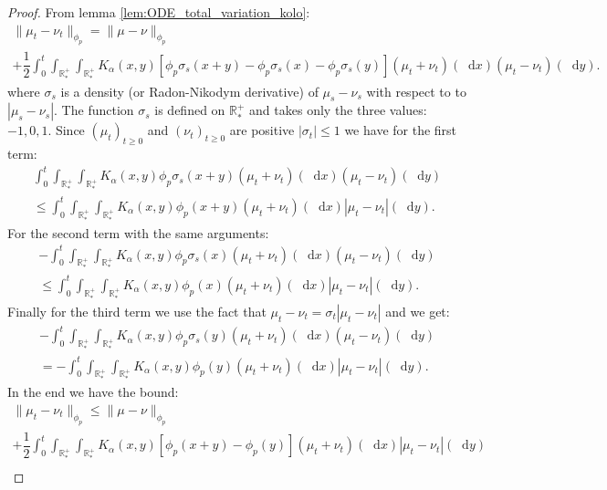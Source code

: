 \documentclass[11pt,a4paper]{article}
\newcommand{\RRP}{\mathbb{R}^+_*}
\newcommand{\Proc}[1]{\left(#1\right)_{t\geq 0}}
\newcommand{\dd}{\mathop{}\!\mathrm{d}}
\begin{document}
\begin{proof}
    From lemma \ref{lem:ODE_total_variation_kolo}:
    \begin{multline*}
        \| \mu_t - \nu_t\|_{\phi_p} = \|\mu- \nu\|_{\phi_p} \\
        + \dfrac12\int_0^t \int_{\RRP}\int_{\RRP} K_\alpha(x,y) \left[\phi_p\sigma_s(x+y) - \phi_p\sigma_s(x) - \phi_p\sigma_s(y) \right]\left(\mu_t + \nu_t\right)(\dd x) \left(\mu_t - \nu_t\right)(\dd y).
    \end{multline*}
    where $\sigma_s$ is a density (or Radon-Nikodym derivative) of $\mu_s - \nu_s$ with respect to to $|\mu_s - \nu_s|$. The function $\sigma_s$ is defined on $\RRP$ and takes only the three values: $-1,0,1$. Since $\Proc{\mu_t}$ and $\Proc{\nu_t}$ are positive $|\sigma_t| \leq 1$ we have for the first term:
    \begin{multline*}
        \int_0^t \int_{\RRP}\int_{\RRP} K_\alpha(x,y) \phi_p\sigma_s(x+y)\left(\mu_t + \nu_t\right)(\dd x) \left(\mu_t - \nu_t\right)(\dd y) \\
        \leq \int_0^t \int_{\RRP}\int_{\RRP} K_\alpha(x,y) \phi_p(x+y)\left(\mu_t + \nu_t\right)(\dd x) \left|\mu_t - \nu_t\right|(\dd y) .
    \end{multline*}
    For the second term with the same arguments:
    \begin{multline*}
        -\int_0^t \int_{\RRP}\int_{\RRP} K_\alpha(x,y) \phi_p\sigma_s(x)\left(\mu_t + \nu_t\right)(\dd x) \left(\mu_t - \nu_t\right)(\dd y) \\
        \leq \int_0^t \int_{\RRP}\int_{\RRP} K_\alpha(x,y) \phi_p(x)\left(\mu_t + \nu_t\right)(\dd x) \left|\mu_t - \nu_t\right|(\dd y).
    \end{multline*}
    Finally for the third term we use the fact that $\mu_t - \nu_t = \sigma_t\left| \mu_t - \nu_t \right|$ and we get:
    \begin{multline*}
        -\int_0^t \int_{\RRP}\int_{\RRP} K_\alpha(x,y) \phi_p\sigma_s(y)\left(\mu_t + \nu_t\right)(\dd x) \left(\mu_t - \nu_t\right)(\dd y) \\
        = -\int_0^t \int_{\RRP}\int_{\RRP} K_\alpha(x,y) \phi_p(y)\left(\mu_t + \nu_t\right)(\dd x) \left|\mu_t - \nu_t\right|(\dd y).
    \end{multline*}
    In the end we have the bound:
    \begin{multline*}
        \| \mu_t - \nu_t\|_{\phi_p} \leq \|\mu- \nu\|_{\phi_p} \\
        + \dfrac12\int_0^t \int_{\RRP}\int_{\RRP} K_\alpha(x,y) \left[\phi_p(x+y) - \phi_p(y) \right]\left(\mu_t + \nu_t\right)(\dd x) \left|\mu_t - \nu_t\right|(\dd y) \\

\end{multline*}
\end{proof}
\end{document}
